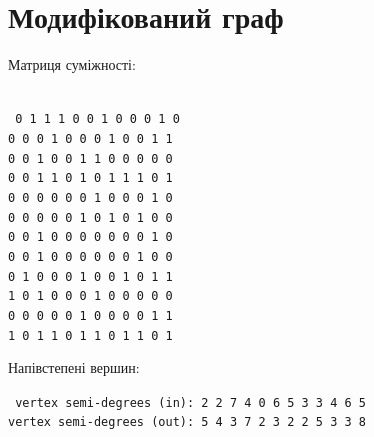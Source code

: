 \section{Модифікований граф}
\begin{minipage}[t]{0.45\linewidth}
  \begin{framed}
    \noindent%
    Матриця суміжності:\\\\
    \raggedright\footnotesize\texttt{%
        0 1 1 1 0 0 1 0 0 0 1 0\\
        0 0 0 1 0 0 0 1 0 0 1 1\\
        0 0 1 0 0 1 1 0 0 0 0 0\\
        0 0 1 1 0 1 0 1 1 1 0 1\\
        0 0 0 0 0 0 1 0 0 0 1 0\\
        0 0 0 0 0 1 0 1 0 1 0 0\\
        0 0 1 0 0 0 0 0 0 0 1 0\\
        0 0 1 0 0 0 0 0 0 1 0 0\\
        0 1 0 0 0 1 0 0 1 0 1 1\\
        1 0 1 0 0 0 1 0 0 0 0 0\\
        0 0 0 0 0 1 0 0 0 0 1 1\\
        1 0 1 1 0 1 1 0 1 1 0 1\\
    }
  \end{framed}
\end{minipage}
\begin{minipage}[t]{0.45\linewidth}
  \begin{framed}
    \noindent%
    Напівстепені вершин:\\
    \raggedright\footnotesize\texttt{%
      vertex semi-degrees (in):  2 2 7 4 0 6 5 3 3 4 6 5\\
      vertex semi-degrees (out): 5 4 3 7 2 3 2 2 5 3 3 8\\
    }
  \end{framed}
\end{minipage}
\hfill
